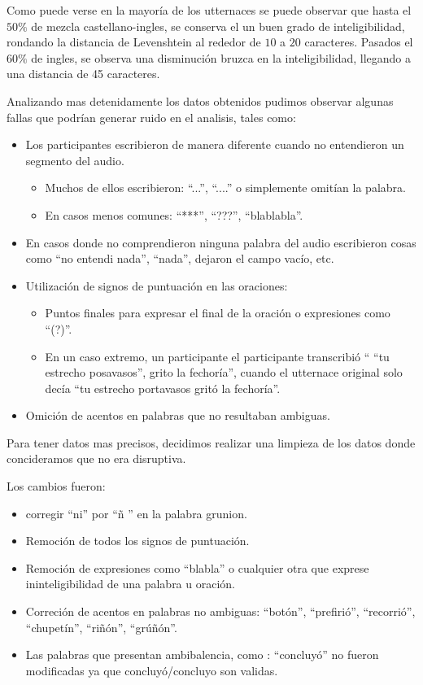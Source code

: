 Como puede verse en la mayoría de los utternaces se puede observar que hasta el $50\%$ de mezcla castellano-ingles, se conserva el un buen grado de inteligibilidad, rondando la distancia de Levenshtein al rededor de $10$ a $20$ caracteres. Pasados el $60\%$ de ingles, se observa una disminución bruzca en la inteligibilidad, llegando a una distancia de 45 caracteres.

Analizando mas detenidamente los datos obtenidos pudimos observar algunas fallas que podrían generar ruido en el analisis, tales como:

\begin{itemize}
	\item Los participantes escribieron de manera diferente cuando no entendieron un segmento del audio.
		\begin{itemize}
		\item Muchos de ellos escribieron: ``...'', ``....'' o simplemente omitían la palabra.
		\item En casos menos comunes: ``***'', ``???'', ``blablabla''.
		\end{itemize}
	\item En casos donde no comprendieron ninguna palabra del audio escribieron cosas como ``no entendi nada'', ``nada'', dejaron el campo vacío, etc.
	\item Utilización de signos de puntuación en las oraciones:
		\begin{itemize}
		\item Puntos finales para expresar el final de la oración o expresiones como ``(?)''.
		\item En un caso extremo, un participante el participante transcribió `` ``tu estrecho posavasos'', grito la fechoría'', cuando el utternace original solo decía ``tu estrecho portavasos gritó la fechoría''.
		\end{itemize}
	\item Omición de acentos en palabras que no resultaban ambiguas.
\end{itemize}

Para tener datos mas precisos, decidimos realizar una limpieza de los datos donde concideramos que no era disruptiva.

Los cambios fueron:

\begin{itemize}
\item corregir ``ni'' por ``\~{n} '' en la palabra grunion.
\item Remoción de todos los signos de puntuación. 
\item Remoción de expresiones como ``blabla'' o cualquier otra que exprese ininteligibilidad de una palabra u oración.
\item Correción de acentos en palabras no ambiguas: ``botón'', ``prefirió'', ``recorrió'', ``chupetín'', ``riñón'', ``grúñón''.
\item Las palabras que presentan ambibalencia, como : ``concluyó'' no fueron modificadas ya que concluyó/concluyo son validas.
\end{itemize}


